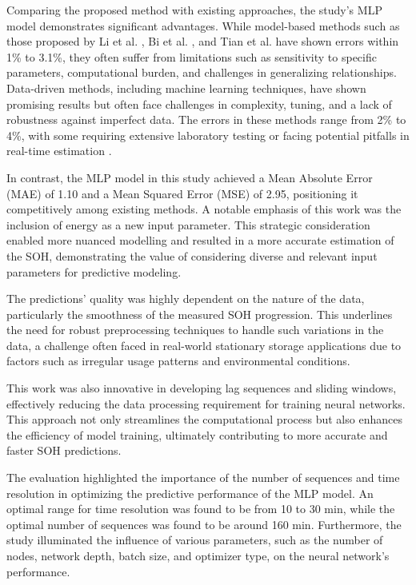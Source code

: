 \documentclass[energies,article,accept,pdftex,moreauthors]{Definitions/mdpi}
\begin{document}
Comparing the proposed method with existing approaches, the study's MLP model demonstrates significant advantages. While model-based methods such as those proposed by Li et al. \cite{Li.2021}, Bi et al. \cite{Bi.2020}, and Tian et al. \cite{Tian.2019} have shown errors within 1\% to 3.1\%, they often suffer from limitations such as sensitivity to specific parameters, computational burden, and challenges in generalizing relationships. Data-driven methods, including machine learning techniques, have shown promising results but often face challenges in complexity, tuning, and a lack of robustness against imperfect data. The errors in these methods range from 2\% to 4\%, with some requiring extensive laboratory testing or facing potential pitfalls in real-time estimation \cite{Shi.2021, Stroe.2018b, Xiong.2021, Sui., Jo.2021, Kim.2018, Chaoui.2017}. %

In contrast, the MLP model in this study achieved a Mean Absolute Error (MAE) of 1.10 and a Mean Squared Error (MSE) of 2.95, positioning it competitively among existing methods. A notable emphasis of this work was the inclusion of energy as a new input parameter. This strategic consideration enabled more nuanced modelling and resulted in a more accurate estimation of the SOH, demonstrating the value of considering diverse and relevant input parameters for predictive modeling.

The predictions' quality was highly dependent on the nature of the data, particularly the smoothness of the measured SOH progression. This underlines the need for robust preprocessing techniques to handle such variations in the data, a challenge often faced in real-world stationary storage applications due to factors such as irregular usage patterns and environmental conditions.

This work was also innovative in %
developing lag sequences and sliding windows, effectively reducing the data processing requirement for training neural networks. This approach not only streamlines the computational process but also enhances the efficiency of model training, ultimately contributing to more accurate and faster SOH predictions.

The evaluation highlighted the importance of the number of sequences and time resolution in optimizing the predictive performance of the MLP model. An optimal range for time resolution was found to be from 10 to 30 min, while the optimal number of sequences was found to be around 160 min. Furthermore, the study illuminated the influence of various parameters, such as the number of nodes, network depth, batch size, and optimizer type, on the neural network's performance.
\end{document}
